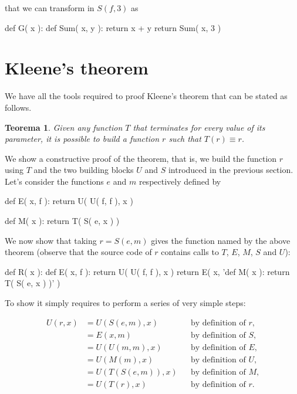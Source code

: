 \documentclass[a4paper]{article}
\newtheorem{teo}{Teorema}
\begin{document}
that we can transform in $S( f, 3 )$ as

\begin{pycode}
def G( x ):
  def Sum( x, y ):
    return x + y
  return Sum( x, 3 )
\end{pycode}

\section*{Kleene's theorem}

We have all the tools required to proof Kleene's theorem that can be stated as follows.

\begin{teo}
Given any function $T$ that terminates for every value of its parameter, it is
possible to build a function $r$ such that  $T(r) \equiv r$.
\end{teo}

We show a constructive proof of the theorem, that is, we build the function
$r$ using $T$ and the two building blocks $U$ and $S$ introduced in the
previous section. Let's consider the functions $e$ and $m$ respectively defined
by

\begin{pycode}
def E( x, f ): return U( U( f, f ), x )
\end{pycode}

\begin{pycode}
def M( x ): return T( S( e, x ) )
\end{pycode}

We now show that taking $r = S( e, m )$ gives the function named by the above
theorem (observe that the source code of $r$  contains calls to $T$, $E$, $M$,
$S$ and $U$):

\begin{pycode}
def R( x ):
  def E( x, f ): return U( U( f, f ), x )
  return E( x, 'def M( x ): return T( S( e, x ) )' )
\end{pycode}

To show it simply requires to perform a series of very simple steps:

\begin{align*}
  U( r, x ) &= U( S( e, m ), x ) && \text{by definition of $r$,}\\
    &= E( x, m )                 && \text{by definition of $S$,}\\
    &= U( U( m, m ), x )         && \text{by definition of $E$,}\\
    &= U( M( m ), x )            && \text{by definition of $U$,}\\
    &= U( T( S( e, m ) ), x )    && \text{by definition of $M$,}\\
    &= U( T( r ), x )            && \text{by definition of $r$.}
\end{align*}
\end{document}
